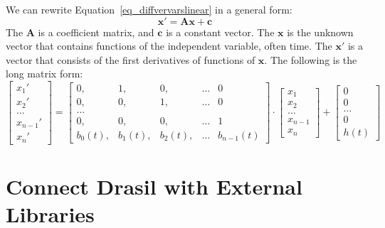 We can rewrite Equation~\ref{eq_diffvervarslinear} in a general form:
\begin{equation} \label{eq_foode}
  \boldsymbol{x}' = \boldsymbol{Ax} + \boldsymbol{c}
\end{equation}
The $\boldsymbol{A}$ is a coefficient matrix, and $\boldsymbol{c}$ is a constant vector. The $\boldsymbol{x}$ is the unknown vector that contains functions of the independent variable, often time. The $\boldsymbol{x'}$ is a vector that consists of the first derivatives of functions of $\boldsymbol{x}$. The following is the long matrix form:
\begin{equation} \label{eq_foodeexample}
	\begin{bmatrix}
		x_{1}' \\
    x_{2}' \\
    \dots  \\
    x_{n-1}' \\
    x_{n}'
	\end{bmatrix}
    = 
  \begin{bmatrix}
		0, & 1, & 0, & \dots & 0 \\
    0, & 0, & 1, & \dots & 0 \\
    \dots \\
    0, & 0, & 0, & \dots & 1 \\
    b_{0}(t), & b_{1}(t), & b_{2}(t), & \dots & b_{n-1}(t)
	\end{bmatrix}
    \cdot
  \begin{bmatrix}
		x_{1} \\
    x_{2} \\
    \dots  \\
    x_{n-1} \\
    x_{n}
	\end{bmatrix}
    + 
  \begin{bmatrix}
    0 \\
    0 \\
    \dots  \\
    0 \\
    h(t)
	\end{bmatrix}
\end{equation}

\section{Connect Drasil with External Libraries}
\label{se_connecteetolib}

